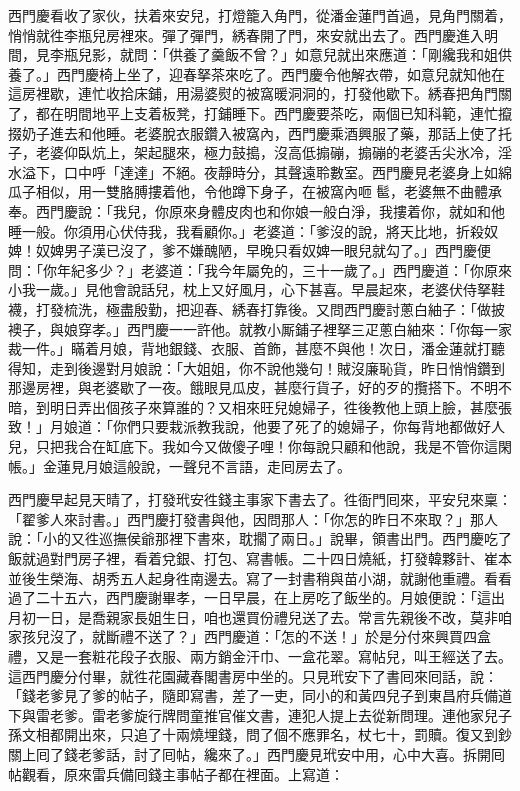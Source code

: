 西門慶看收了家伙，扶着來安兒，打燈籠入角門，從潘金蓮門首過，見角門關着，悄悄就徃李瓶兒房裡來。彈了彈門，{}綉春開了門，來安就出去了。西門慶進入明間，見李瓶兒影，就問：「供養了羹飯不曾？」如意兒就出來應道：「剛纔我和姐供養了。」西門慶椅上坐了，迎春拏茶來吃了。西門慶令他解衣帶，如意兒就知他在這房裡歇，連忙收拾床鋪，用湯婆熨的被窩暖洞洞的，打發他歇下。綉春把角門關了，都在明間地平上支着板凳，打鋪睡下。西門慶要茶吃，兩個已知科範，連忙攛掇奶子進去和他睡。老婆脫衣服鑽入被窩內，西門慶乘酒興服了藥，那話上使了托子，老婆仰臥炕上，架起腿來，極力鼓搗，沒高低搧磞，搧磞的老婆舌尖氷冷，淫水溢下，口中呼「達達」不絕。夜靜時分，其聲遠聆數室。{}西門慶見老婆身上如綿瓜子相似，用一雙胳膊摟着他，令他蹲下身子，在被窩內咂𩫻䯲，老婆無不曲體承奉。西門慶說：「我兒，你原來身體皮肉也和你娘一般白淨，我摟着你，就如和他睡一般。{}你須用心伏侍我，我看顧你。」老婆道：「爹沒的說，將天比地，折殺奴婢！奴婢男子漢已沒了，爹不嫌醜陋，早晚只看奴婢一眼兒就勾了。」西門慶便問：「你年紀多少？」老婆道：「我今年屬免的，三十一歲了。」西門慶道：「你原來小我一歲。」見他會說話兒，枕上又好風月，心下甚喜。早晨起來，老婆伏侍拏鞋襪，打發梳洗，極盡殷勤，把迎春、綉春打靠後。又問西門慶討蔥白紬子：「做披襖子，與娘穿孝。」西門慶一一許他。就教小厮鋪子裡拏三疋蔥白紬來：「你每一家裁一件。」瞞着月娘，背地銀錢、衣服、首飾，甚麼不與他！次日，潘金蓮就打聽得知，走到後邊對月娘說：「大姐姐，你不說他幾句！賊沒廉恥貨，昨日悄悄鑽到那邊房裡，與老婆歇了一夜。餓眼見瓜皮，甚麼行貨子，好的歹的攬搭下。不明不暗，到明日弄出個孩子來算誰的？又相來旺兒媳婦子，徃後教他上頭上臉，甚麼張致！」月娘道：「你們只要栽派教我說，他要了死了的媳婦子，你每背地都做好人兒，只把我合在缸底下。我如今又做傻子哩！你每說只顧和他說，我是不管你這閑帳。」金蓮見月娘這般說，一聲兒不言語，走囘房去了。

西門慶早起見天晴了，打發玳安徃錢主事家下書去了。徃衙門囘來，平安兒來稟：「翟爹人來討書。」西門慶打發書與他，因問那人：「你怎的昨日不來取？」那人說：「小的又徃巡撫侯爺那裡下書來，{}耽擱了兩日。」說畢，領書出門。西門慶吃了飯就過對門房子裡，看着兌銀、打包、寫書帳。二十四日燒紙，打發韓夥計、崔本並後生榮海、胡秀五人起身徃南邊去。寫了一封書稍與苗小湖，就謝他重禮。看看過了二十五六，西門慶謝畢孝，一日早晨，在上房吃了飯坐的。月娘便說：「這出月初一日，是喬親家長姐生日，咱也還買份禮兒送了去。常言先親後不改，莫非咱家孩兒沒了，就斷禮不送了？」西門慶道：「怎的不送！」於是分付來興買四盒禮，又是一套粧花段子衣服、兩方銷金汗巾、一盒花翠。寫帖兒，叫王經送了去。這西門慶分付畢，就徃花園藏春閣書房中坐的。只見玳安下了書囘來囘話，說：「錢老爹見了爹的帖子，隨即寫書，差了一吏，同小的和黃四兒子到東昌府兵備道下與雷老爹。雷老爹旋行牌問童推官催文書，連犯人提上去從新問理。連他家兒子孫文相都開出來，只追了十兩燒埋錢，問了個不應罪名，杖七十，罰贖。復又到鈔關上囘了錢老爹話，討了囘帖，纔來了。」西門慶見玳安中用，心中大喜。拆開囘帖觀看，原來雷兵備囘錢主事帖子都在裡面。上寫道：

